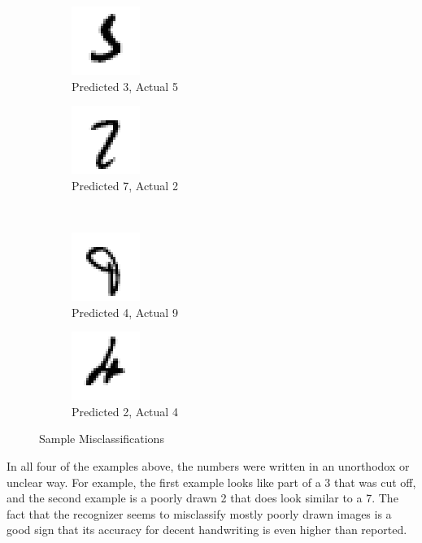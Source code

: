 \documentclass[12pt]{article}
\begin{document}
\begin{figure}[h]
\centering
\begin{subfigure}{.25\textwidth}
  \centering
  \includegraphics[width=.2\linewidth]{mistake[3]_5.png}
  \caption{Predicted 3, Actual 5}
  \label{fig:sub1}
\end{subfigure}%
\hspace{4mm}
\begin{subfigure}{.25\textwidth}
  \centering
  \includegraphics[width=.2\linewidth]{mistake[7]_2.png}
  \caption{Predicted 7, Actual 2}
  \label{fig:sub2}
\end{subfigure}
\\
\begin{subfigure}{.25\textwidth}
  \centering
  \includegraphics[width=.2\linewidth]{mistake[4]_9.png}
  \caption{Predicted 4, Actual 9}
  \label{fig:sub3}
\end{subfigure}
\begin{subfigure}{.25\textwidth}
  \centering
  \includegraphics[width=.2\linewidth]{mistake[2]_4.png}
  \caption{Predicted 2, Actual 4}
  \label{fig:sub4}
\end{subfigure}
\caption{Sample Misclassifications}
\label{fig:test}
\end{figure}

In all four of the examples above, the numbers were written in an unorthodox or unclear way. For example, the first example looks like part of a 3 that was cut off, and the second example is a poorly drawn 2 that does look similar to a 7. The fact that the recognizer seems to misclassify mostly poorly drawn images is a good sign that its accuracy for decent handwriting is even higher than reported.
\end{document}
